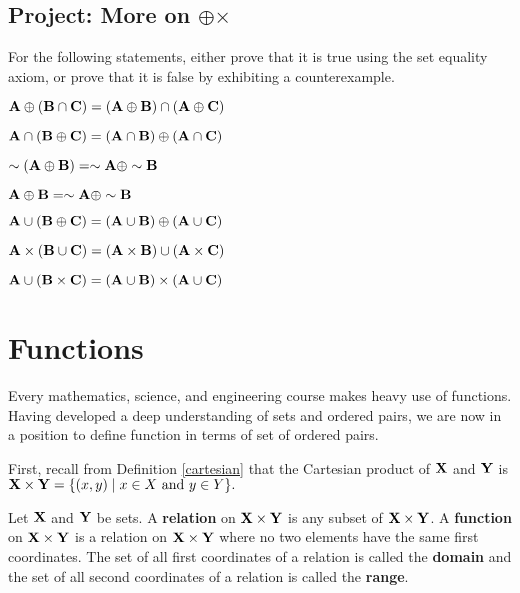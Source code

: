 \section{Project:  More on \texorpdfstring{$\oplus$}\texorpdfstring{$\times$}\text{} }


For the following statements, either prove that it is true using the set equality axiom, or prove that it is false by exhibiting a counterexample.

\begin{prb}
$\mathbf A \oplus (\mathbf B \cap \mathbf C)=(\mathbf A \oplus \mathbf B) \cap (\mathbf A \oplus \mathbf C)$
\end{prb}

\begin{prb}
$\mathbf A \cap (\mathbf B \oplus \mathbf C) = (\mathbf A \cap \mathbf B) \oplus (\mathbf A \cap \mathbf C)$
\end{prb}

\begin{prb}
$\sim (\mathbf A \oplus \mathbf B) = \sim \mathbf A \oplus \sim \mathbf B$
\end{prb}

\begin{prb}
$\mathbf A \oplus \mathbf B = \sim \mathbf A \oplus \sim \mathbf B$
\end{prb}

\begin{prb}
$\mathbf A \cup (\mathbf B \oplus \mathbf C) = (\mathbf A \cup \mathbf B) \oplus (\mathbf A \cup \mathbf C)$
\end{prb}


\begin{prb}
$\mathbf A\times(\mathbf B\cup \mathbf C) = (\mathbf A\times \mathbf B) \cup (\mathbf A\times \mathbf C)$
\end{prb}

\begin{prb}
$\mathbf A\cup(\mathbf B\times \mathbf C) = (\mathbf A\cup \mathbf B) \times (\mathbf A\cup \mathbf C)$
\end{prb}


\chapter{Functions}

Every mathematics, science, and engineering course makes heavy use of functions. Having developed a deep understanding of sets and ordered pairs, we are now in a position to define function in terms of set of ordered pairs.


First, recall from Definition \ref{cartesian} that the Cartesian product of $\mathbf X$ and $\mathbf Y$ is $\mathbf X \times \mathbf Y = \{(x,y) \mid  x \in X \mbox{ and } y\in Y\}.$

\begin{dfn}
\label{function}
Let $\mathbf X$ and $\mathbf Y$ be sets. A \textbf{relation} on $\mathbf X \times \mathbf Y$ is any subset of $\mathbf X \times \mathbf Y$. A \textbf{function} on $\mathbf X \times \mathbf Y$ is a relation on $\mathbf X \times \mathbf Y$ where no two elements have the same first coordinates.  The set of all first coordinates of a relation is called the \textbf{domain} and the set of all second coordinates of a relation is called the \textbf{range}.
\end{dfn}

